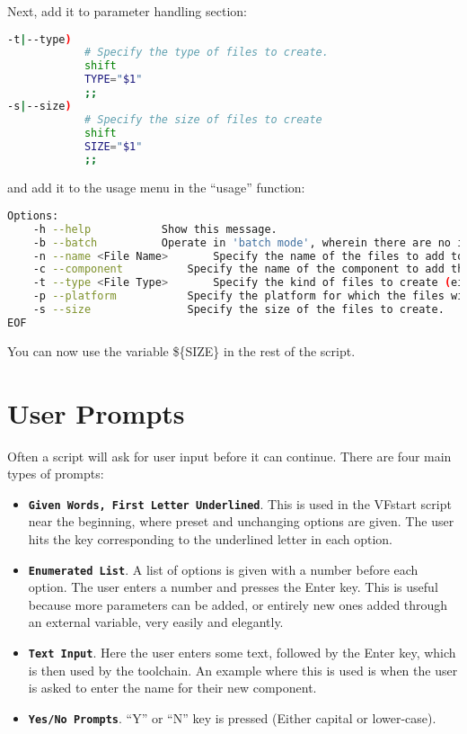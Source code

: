 \documentclass[a4paper, oneside, 11pt, titlepage, onecolumn, openright]{report}
\begin{document}
Next, add it to parameter handling section:
\begin{lstlisting}[frame=trBL, breaklines=true, language=bash]
-t|--type)
			# Specify the type of files to create.
			shift
			TYPE="$1"
			;;
-s|--size)
			# Specify the size of files to create
			shift
			SIZE="$1"
			;;
\end{lstlisting}

and add it to the usage menu in the ``usage'' function:

\begin{lstlisting}[frame=trBL, breaklines=true, language = bash]
Options:
	-h --help			Show this message.
	-b --batch			Operate in 'batch mode', wherein there are no interactive prompts.
	-n --name <File Name>		Specify the name of the files to add to the current project.
	-c --component			Specify the name of the component to add the files to.  Defaults to the 'active component'.
	-t --type <File Type>		Specify the kind of files to create (either 'C' or 'CPP').
	-p --platform			Specify the platform for which the files will be created (BareMetal/freertos)
	-s --size				Specify the size of the files to create.
EOF
\end{lstlisting}

You can now use the variable \$\{SIZE\} in the rest of the script. 

\section{User Prompts}
			\label{s:UserPrompts}
			Often a script will ask for user input before it can continue. There are four main types of prompts:
			
\begin{itemize}

\item \textbf{\texttt{Given Words, First Letter Underlined}}. This is used in the VFstart script near the beginning, where preset and unchanging options are given. The user hits the key corresponding to the underlined letter in each option. 

\item \textbf{\texttt{Enumerated List}}. A list of options is given with a number before each option. The user enters a number and presses the Enter key. This is useful because more parameters can be added, or entirely new ones added through an external variable, very easily and elegantly.

\item \textbf{\texttt{Text Input}}. Here the user enters some text, followed by the Enter key, which is then used by the toolchain. An example where this is used is when the user is asked to enter the name for their new component.

\item \textbf{\texttt{Yes/No Prompts}}. ``Y'' or ``N'' key is pressed (Either capital or lower-case).
\end{itemize}			
			
\end{document}
